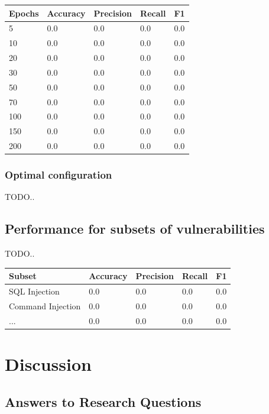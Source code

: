 \documentclass[
	a4paper,
	pagesize,
	pdftex,
	12pt,
	twoside, %
	BCOR=5mm, %
	ngerman,
	fleqn,
	final,
	]{scrartcl}
\begin{document}
\begin{tabular}{ | p{2cm} || p{2cm}|p{2cm}|p{2cm}|p{2cm}|  }
	\hline
	Epochs & Accuracy & Precision & Recall & F1 \\
	\hline
	5 & 0.0 &  0.0 &  0.0 &  0.0 \\
	10 & 0.0 &  0.0 &  0.0 &  0.0 \\
	20 & 0.0 &  0.0 &  0.0 &  0.0 \\
	30 & 0.0 &  0.0 &  0.0 &  0.0 \\
	50 & 0.0 &  0.0 &  0.0 &  0.0 \\
	70 & 0.0 &  0.0 &  0.0 &  0.0 \\
	100 & 0.0 &  0.0 &  0.0 &  0.0 \\
	150 & 0.0 &  0.0 &  0.0 &  0.0 \\
	200 & 0.0 &  0.0 &  0.0 &  0.0 \\
	\hline
	\hline
\end{tabular}

\subsubsection{Optimal configuration}


TODO..






\subsection{Performance for subsets of vulnerabilities}


TODO..

\begin{tabular}{ | p{5cm} || p{2cm}|p{2cm}|p{2cm}|p{2cm}|  }
	\hline
	Subset & Accuracy & Precision & Recall & F1 \\
	\hline
	SQL Injection & 0.0 &  0.0 &  0.0 &  0.0 \\
	Command Injection & 0.0 &  0.0 &  0.0 &  0.0 \\
	... & 0.0 &  0.0 &  0.0 &  0.0 \\
	\hline
	\hline
\end{tabular}



\newpage
\section{Discussion}


\subsection{Answers to Research Questions}
\end{document}
